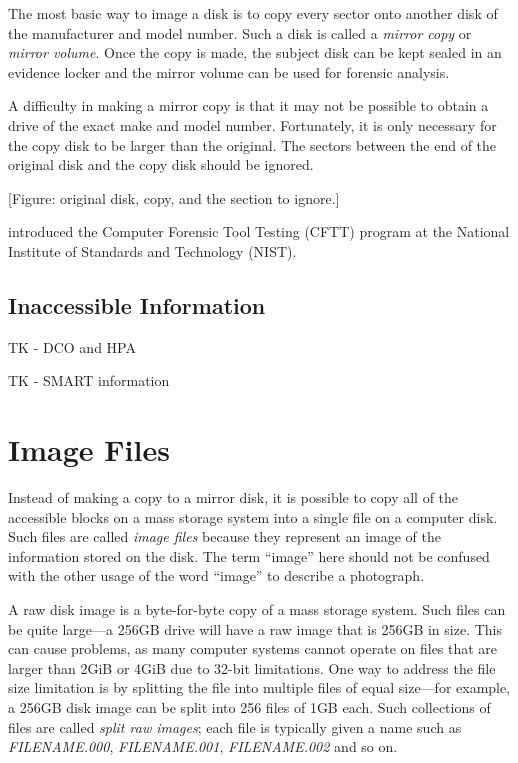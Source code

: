 The most basic way to image a disk is to copy every sector onto
another disk of the manufacturer and model number. Such a disk is
called a \emph{mirror copy} or \emph{mirror volume}. Once the copy is made, the subject disk
can be kept sealed in an evidence locker and the mirror volume can be
used for forensic analysis. 

A difficulty in making a mirror copy is that it may not be possible to
obtain a drive of the exact make and model number. Fortunately, it is
only necessary for the copy disk to be larger than the original. The
sectors between the end of the original disk and the copy disk should
be ignored.

[Figure: original disk, copy, and the section to ignore.]

 introduced the Computer Forensic Tool Testing (CFTT)
program at the National Institute of Standards and Technology (NIST).

\subsection{Inaccessible Information}

TK - DCO and HPA

TK - SMART information

\section{Image Files}
Instead of making a copy to a mirror disk, it is possible to copy all
of the accessible blocks on a mass storage system into a single file
on a computer disk. Such files are called \emph{image files} because
they represent an image of the information stored on the disk. The
term ``image'' here should not be confused with the other usage of the
word ``image'' to describe a photograph.

A raw disk image is a byte-for-byte copy of a mass storage
system. Such files can be quite large---a 256GB drive will have a raw
image that is 256GB in size. This can cause problems, as many computer
systems cannot operate on files that are larger than 2GiB or 4GiB due
to 32-bit limitations. One way to address the file size limitation is
by splitting the file into multiple files of equal size---for example,
a 256GB disk image can be split into 256 files of 1GB each. Such
collections of files are called \emph{split raw images}; each file is
typically given a name such as \emph{FILENAME.000}, \emph{FILENAME.001},
\emph{FILENAME.002} and so on.

